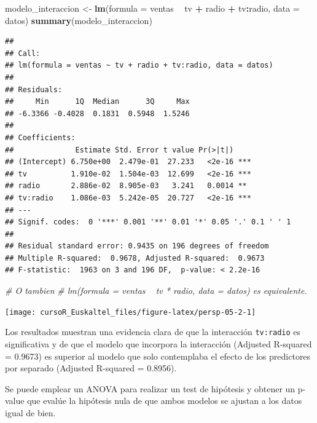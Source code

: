 \documentclass[]{book}
\newenvironment{Shaded}{\begin{snugshade}}{\end{snugshade}}
\newcommand{\KeywordTok}[1]{\textcolor[rgb]{0.13,0.29,0.53}{\textbf{#1}}}
\newcommand{\DataTypeTok}[1]{\textcolor[rgb]{0.13,0.29,0.53}{#1}}
\newcommand{\StringTok}[1]{\textcolor[rgb]{0.31,0.60,0.02}{#1}}
\newcommand{\CommentTok}[1]{\textcolor[rgb]{0.56,0.35,0.01}{\textit{#1}}}
\newcommand{\OperatorTok}[1]{\textcolor[rgb]{0.81,0.36,0.00}{\textbf{#1}}}
\newcommand{\NormalTok}[1]{#1}
\begin{document}
\begin{Shaded}
\begin{Highlighting}[]
\NormalTok{modelo_interaccion <-}\StringTok{ }\KeywordTok{lm}\NormalTok{(}\DataTypeTok{formula =}\NormalTok{ ventas }\OperatorTok{~}\StringTok{ }\NormalTok{tv }\OperatorTok{+}\StringTok{ }\NormalTok{radio }\OperatorTok{+}\StringTok{ }\NormalTok{tv}\OperatorTok{:}\NormalTok{radio, }\DataTypeTok{data =}\NormalTok{ datos)}
\KeywordTok{summary}\NormalTok{(modelo_interaccion)}
\end{Highlighting}
\end{Shaded}

\begin{verbatim}
## 
## Call:
## lm(formula = ventas ~ tv + radio + tv:radio, data = datos)
## 
## Residuals:
##     Min      1Q  Median      3Q     Max 
## -6.3366 -0.4028  0.1831  0.5948  1.5246 
## 
## Coefficients:
##              Estimate Std. Error t value Pr(>|t|)    
## (Intercept) 6.750e+00  2.479e-01  27.233   <2e-16 ***
## tv          1.910e-02  1.504e-03  12.699   <2e-16 ***
## radio       2.886e-02  8.905e-03   3.241   0.0014 ** 
## tv:radio    1.086e-03  5.242e-05  20.727   <2e-16 ***
## ---
## Signif. codes:  0 '***' 0.001 '**' 0.01 '*' 0.05 '.' 0.1 ' ' 1
## 
## Residual standard error: 0.9435 on 196 degrees of freedom
## Multiple R-squared:  0.9678, Adjusted R-squared:  0.9673 
## F-statistic:  1963 on 3 and 196 DF,  p-value: < 2.2e-16
\end{verbatim}

\begin{Shaded}
\begin{Highlighting}[]
\CommentTok{# O tambien}
\CommentTok{# lm(formula = ventas ~ tv * radio, data = datos) es equivalente.}
\end{Highlighting}
\end{Shaded}

\begin{center}\texttt{[image: cursoR\_Euskaltel\_files/figure-latex/persp-05-2-1]} \end{center}

Los resultados muestran una evidencia clara de que la interacción
\texttt{tv:radio} es significativa y de que el modelo que incorpora la
interacción (Adjusted R-squared = 0.9673) es superior al modelo que solo
contemplaba el efecto de los predictores por separado (Adjusted
R-squared = 0.8956).

Se puede emplear un ANOVA para realizar un test de hipótesis y obtener
un p-value que evalúe la hipótesis nula de que ambos modelos se ajustan
a los datos igual de bien.
\end{document}
